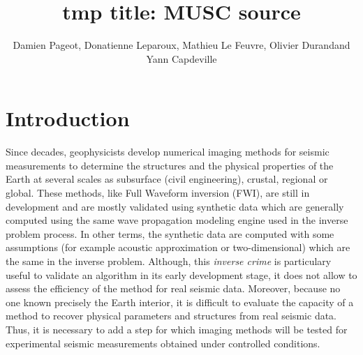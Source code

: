 \documentclass[manuscript,revised]{geophysics}
\begin{document}
\title{tmp title: MUSC source}

\renewcommand{\thefootnote}{\fnsymbol{footnote}} 


\address{
\footnotemark[1]LUNAM-IFSTTAR, \\
\footnotemark[2]OSUNA \\
\footnotemark[1]LPGN, \\}
\author{Damien Pageot\footnotemark[1]\footnotemark[2], Donatienne Leparoux\footnotemark[1], Mathieu Le Feuvre\footnotemark[1], Olivier Durand\footnotemark[1] and Yann Capdeville\footnotemark[3]}


\maketitle

\begin{abstract}
\end{abstract}

\section{Introduction}

\noindent Since decades, geophysicists develop numerical imaging methods for seismic measurements to determine the structures and the physical properties of the Earth at several scales as subsurface (civil engineering), crustal, regional or global. These methods, like Full Waveform inversion (FWI), are still in development and are mostly validated using synthetic data which are generally computed using the same wave propagation modeling engine used in the inverse problem process. In other terms, the synthetic data are computed with some assumptions (for example acoustic approximation or two-dimensional) which are the same in the inverse problem. Although, this \textit{inverse crime} \citep{Wirgin_TIC_2004} is particulary useful to validate an algorithm in its early development stage, it does not allow to assess the efficiency of the method for real seismic data. Moreover, because no one known precisely the Earth interior, it is difficult to evaluate the capacity of a method to recover physical parameters and structures from real seismic data. Thus, it is necessary to add a step for which imaging methods will be tested for experimental seismic measurements obtained under controlled conditions.      
\end{document}
